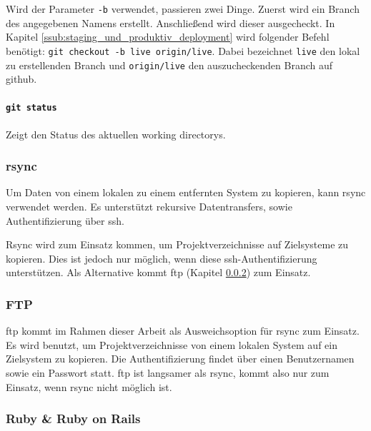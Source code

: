 Wird der Parameter \lstinline!-b! verwendet, passieren zwei Dinge. Zuerst wird ein Branch des angegebenen Namens erstellt. Anschließend wird dieser ausgecheckt. In Kapitel \ref{ssub:staging_und_produktiv_deployment} wird folgender Befehl benötigt: \lstinline!git checkout -b live origin/live!. Dabei bezeichnet \lstinline!live! den lokal zu erstellenden Branch und \lstinline!origin/live! den aus\-zu\-check\-en\-den Branch auf \gls{github}.


\paragraph{\lstinline!git status!} %
\label{par:git_status}
Zeigt den Status des aktuellen \glspl{working directory}.


\subsubsection{rsync} %
\label{ssub:rsync}

Um Daten von einem lokalen zu einem entfernten System zu kopieren, kann rsync verwendet werden. Es unterstützt rekursive Datentransfers, sowie Authentifizierung über \gls{ssh}.

Rsync wird zum Einsatz kommen, um Projektverzeichnisse auf Zielsysteme zu kopieren. Dies ist jedoch nur möglich, wenn diese \gls{ssh}-Authentifizierung unterstützen. Als Alternative kommt \gls{ftp} (Kapitel \ref{ssub:ftp}) zum Einsatz.


\subsubsection{FTP} %
\label{ssub:ftp}

\gls{ftp} kommt im Rahmen dieser Arbeit als Ausweichsoption für \gls{rsync} zum Einsatz. Es wird benutzt, um Projektverzeichnisse von einem lokalen System auf ein Zielsystem zu kopieren. Die Authentifizierung findet über einen Benutzernamen sowie ein Passwort statt. \gls{ftp} ist langsamer als \gls{rsync}, kommt also nur zum Einsatz, wenn \gls{rsync} nicht möglich ist.


\subsubsection{Ruby \& Ruby on Rails} %
\label{ssub:ruby_ruby_on_rails}

